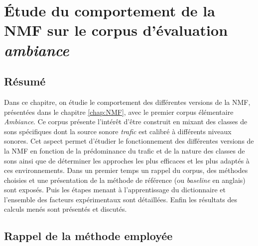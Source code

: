 
\chapter{\'Etude du comportement de la NMF sur le corpus d'évaluation \textit{ambiance}}
\label{chap:ambiance}

\section*{\centering Résumé}


\vspace{2cm}

Dans ce chapitre, on étudie le comportement des différentes versions de la NMF, présentées dans le chapitre \ref{chap:NMF},  avec le premier corpus élémentaire \textit{Ambiance}. Ce corpus présente l'intérêt d'être construit en mixant des classes de sons spécifiques dont la source sonore \textit{trafic} est calibré à différents niveaux sonores. Cet aspect permet d'étudier le fonctionnement des différentes versions de la NMF en fonction de la prédominance du trafic et de la nature des classes de sons ainsi que de déterminer les approches les plus efficaces et les plus adaptés à ces environnements.
Dans un premier temps un rappel du corpus, des méthodes choisies et une présentation de la méthode de référence (ou \textit{baseline} en anglais) sont exposés. Puis les étapes menant à l'apprentissage du dictionnaire et l'ensemble des facteurs expérimentaux sont détaillées. Enfin les résultats des calculs menés sont présentés et discutés.


\section{Rappel de la méthode employée}


